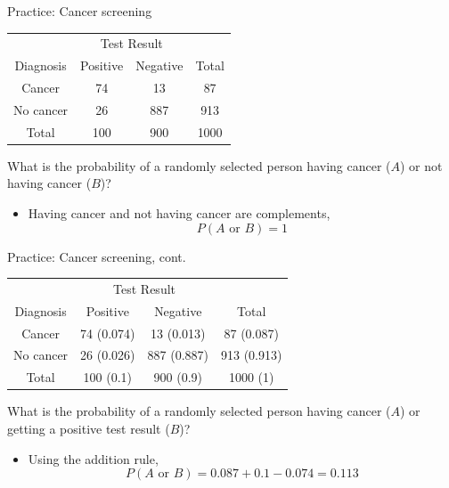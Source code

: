 \documentclass[xcolor=table]{beamer}
\begin{document}
\begin{frame}{Practice: Cancer screening}
\begin{block}{}
{\centering
\begin{tabular}{c | c  c | c}
\multicolumn{1}{c}{} & \multicolumn{2}{c}{Test Result}\\
Diagnosis & Positive & Negative & Total \\
\hline
Cancer & 74 & 13 & 87\\
No cancer & 26 & 887 & 913\\
\hline
Total & 100 & 900 & 1000
\end{tabular}\par
}
\end{block}

\begin{exampleblock}{}
What is the probability of a randomly selected person having cancer ($A$) or not having cancer ($B$)?

\begin{itemize}
\pause
\item Having cancer and not having cancer are complements,
\[ P(A \text{ or } B) = 1\]
\end{itemize}
\end{exampleblock}
\end{frame}

\begin{frame}{Practice: Cancer screening, cont.}
\begin{block}{}
{\centering
\begin{tabular}{c | c  c | c}
\multicolumn{1}{c}{} & \multicolumn{2}{c}{Test Result}\\
Diagnosis & Positive & Negative & Total \\
\hline
Cancer & 74 (0.074) & 13 (0.013) & 87 (0.087)\\
No cancer & 26 (0.026) & 887 (0.887) & 913 (0.913)\\
\hline
Total & 100 (0.1) & 900 (0.9) & 1000 (1)
\end{tabular}\par
}
\end{block}

\begin{exampleblock}{}
What is the probability of a randomly selected person having cancer ($A$) or getting a positive test result ($B$)?

\begin{itemize}
\pause
\item Using the addition rule,
\[ P(A \text{ or } B) = 0.087 + 0.1 - 0.074 = 0.113\]
\end{itemize}
\end{exampleblock}
\end{frame}
\end{document}
